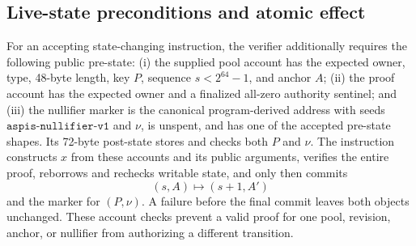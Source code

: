 \subsection{Live-state preconditions and atomic effect}

For an accepting state-changing instruction, the verifier additionally
requires the following public pre-state: (i) the supplied pool account has
the expected owner, type, 48-byte length, key \(P\), sequence
\(s<2^{64}-1\), and anchor
\(A\); (ii) the proof account has the expected owner and a finalized
all-zero authority sentinel; and (iii) the nullifier marker is the canonical
program-derived address with seeds
\(\mathtt{aspis\mbox{-}nullifier\mbox{-}v1}\) and \(\nu\), is unspent, and
has one of the accepted pre-state shapes.  Its 72-byte post-state stores and
checks both \(P\) and \(\nu\).  The instruction
constructs \(x\) from these accounts and its public arguments, verifies the
entire proof, reborrows and rechecks writable state, and only then commits
\[
   (s,A)\longmapsto(s+1,A')
\]
and the marker for \((P,\nu)\).  A failure before the final commit leaves both
objects unchanged.  These account checks prevent a valid proof for one pool,
revision, anchor, or nullifier from authorizing a different transition.
